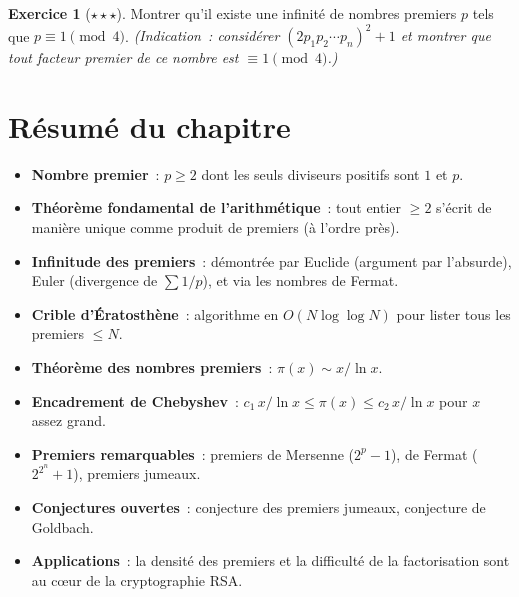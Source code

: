 \documentclass[12pt,a4paper,openany]{book}
\theoremstyle{definition}
\newtheorem{exercice}{Exercice}[chapter]
\theoremstyle{plain}
\theoremstyle{remark}
\begin{document}
\begin{exercice}[$\star\star\star$]
\label{exo:ch2:olympiade3}
Montrer qu'il existe une infinité de nombres premiers $p$ tels que $p \equiv 1
\pmod{4}$. \textit{(Indication~: considérer $(2p_1 p_2 \cdots p_n)^2 + 1$ et
montrer que tout facteur premier de ce nombre est $\equiv 1 \pmod{4}$.)}
\end{exercice}

\section{Résumé du chapitre}
\label{sec:ch2:resume}

\begin{tcolorbox}[enhanced,colback=blue!3,colframe=blue!50!black,
  title={\textbf{Chapitre 2 --- Résumé}},fonttitle=\large,
  breakable]
\begin{itemize}[leftmargin=1.5cm]
  \item \textbf{Nombre premier}~: $p \geq 2$ dont les seuls diviseurs positifs
    sont $1$ et $p$.
  \item \textbf{Théorème fondamental de l'arithmétique}~: tout entier $\geq 2$
    s'écrit de manière unique comme produit de premiers (à l'ordre près).
  \item \textbf{Infinitude des premiers}~: démontrée par Euclide (argument par
    l'absurde), Euler (divergence de $\sum 1/p$), et via les nombres de Fermat.
  \item \textbf{Crible d'Ératosthène}~: algorithme en $O(N \log\log N)$ pour
    lister tous les premiers $\leq N$.
  \item \textbf{Théorème des nombres premiers}~: $\pi(x) \sim x / \ln x$.
  \item \textbf{Encadrement de Chebyshev}~: $c_1\, x/\ln x \leq \pi(x) \leq
    c_2\, x / \ln x$ pour $x$ assez grand.
  \item \textbf{Premiers remarquables}~: premiers de Mersenne ($2^p - 1$), de
    Fermat ($2^{2^n}+1$), premiers jumeaux.
  \item \textbf{Conjectures ouvertes}~: conjecture des premiers jumeaux, conjecture
    de Goldbach.
  \item \textbf{Applications}~: la densité des premiers et la difficulté de la
    factorisation sont au c\oe ur de la cryptographie RSA.
\end{itemize}
\end{tcolorbox}

\end{document}

